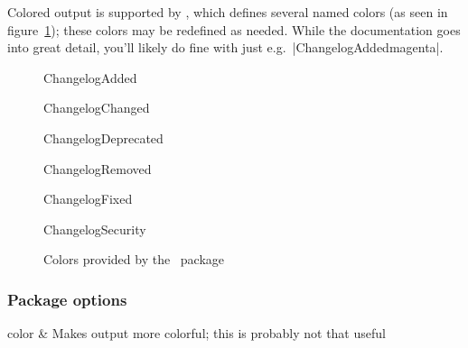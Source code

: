 \documentclass{ltxdoc}
\begin{document}
Colored output is supported by , which defines several named
colors (as seen in figure~\ref{fig:colors}); these colors may be redefined
as needed. While the  documentation goes into great detail,
you'll likely do fine with just e.g.\ |{ChangelogAdded}{magenta}|.

\begin{figure}[h]
	\centering
	\begin{adjustwidth}{1in}{1in}
	\begin{colorlist}
		\item{ChangelogAdded}
		\item{ChangelogChanged}
		\item{ChangelogDeprecated}
		\item{ChangelogRemoved}
		\item{ChangelogFixed}
		\item{ChangelogSecurity}
	\end{colorlist}
	\end{adjustwidth}
	\caption{Colors provided by the \cl\ package}
	\label{fig:colors}
\end{figure}

\subsubsection{Package options}

\begin{Optionlist}
	color & Makes output more colorful; this is probably not that useful
\end{Optionlist}
\end{document}
